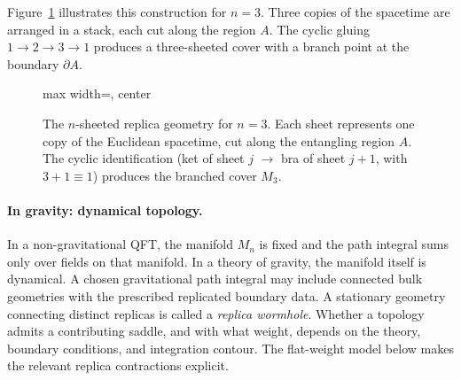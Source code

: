 \documentclass[11pt,letterpaper]{article}
\theoremstyle{plain}
\theoremstyle{definition}
\theoremstyle{remark}
\begin{document}
Figure~\ref{fig06:n_sheeted} illustrates this construction for $n = 3$.  Three
copies of the spacetime are arranged in a stack, each cut along the region $A$.
The cyclic gluing $1 \to 2 \to 3 \to 1$ produces a three-sheeted cover with a
branch point at the boundary $\partial A$.

\begin{figure}[htbp]
\centering
\begin{adjustbox}{max width=\textwidth, center}
\end{adjustbox}
\caption{The $n$-sheeted replica geometry for $n = 3$.  Each sheet represents
one copy of the Euclidean spacetime, cut along the entangling region $A$.  The
cyclic identification (ket of sheet $j$ $\to$ bra of sheet $j+1$, with
$3+1 \equiv 1$) produces the branched cover $M_3$.}
\label{fig06:n_sheeted}
\end{figure}

\paragraph{In gravity: dynamical topology.}
In a non-gravitational QFT, the manifold $M_n$ is fixed and the path integral
sums only over fields on that manifold.  In a theory of gravity, the manifold
itself is dynamical. A chosen gravitational path integral may include
connected bulk geometries with the prescribed replicated boundary data.
A stationary geometry connecting distinct replicas is called a
\emph{replica wormhole}. Whether a topology admits a contributing saddle,
and with what weight, depends on the theory, boundary conditions, and
integration contour. The flat-weight model below makes the relevant
replica contractions explicit.
\end{document}
